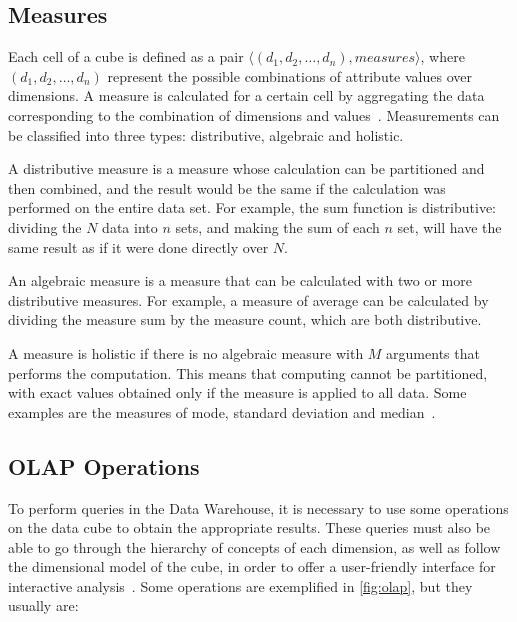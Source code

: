 \subsection{Measures}\label{ch:fun:cube:measures}

Each cell of a cube is defined as a pair $\langle (d_1, d_2, \ldots, d_n), measures \rangle$, where $(d_1, d_2, \ldots, d_n)$ represent the possible combinations of attribute values over dimensions.
A measure is calculated for a certain cell by aggregating the data corresponding to the combination of dimensions and values~\cite{hanDataMiningConcepts2011}.
Measurements can be classified into three types: distributive, algebraic and holistic.

A distributive measure is a measure whose calculation can be partitioned and then combined, and the result would be the same if the calculation was performed on the entire data set.
For example, the sum function is distributive: dividing the $N$ data into $n$ sets, and making the sum of each $n$ set, will have the same result as if it were done directly over $N$.

An algebraic measure is a measure that can be calculated with two or more distributive measures.
For example, a measure of average can be calculated by dividing the measure sum by the measure count, which are both distributive.

A measure is holistic if there is no algebraic measure with $M$ arguments that performs the computation.
This means that computing cannot be partitioned, with exact values obtained only if the measure is applied to all data.
Some examples are the measures of mode, standard deviation and median~\cite{hanDataMiningConcepts2011}.

\subsection{OLAP Operations}\label{ch:fun:cube:olapops}

To perform queries in the Data Warehouse, it is necessary to use some operations on the data cube to obtain the appropriate results.
These queries must also be able to go through the hierarchy of concepts of each dimension, as well as follow the dimensional model of the cube, in order to offer a user-friendly interface for interactive analysis~\cite{hanDataMiningConcepts2011}.
Some operations are exemplified in \autoref{fig:olap}, but they usually are:

